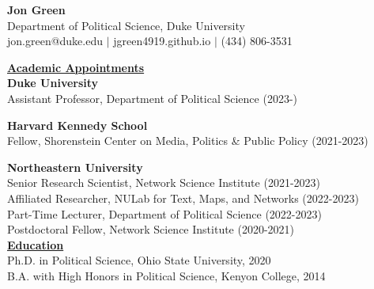 \documentclass{article}
\begin{document}
\begin{center}
\thispagestyle{empty}
\large \textbf{Jon Green} \\
\normalsize Department of Political Science, Duke University\\
\normalsize jon.green@duke.edu $\mid$ jgreen4919.github.io $\mid$ (434) 806-3531
\end{center}

\noindent \textbf{\underline{Academic Appointments}}\\

\noindent \textbf{Duke University}\\
\indent Assistant Professor, Department of Political Science (2023-)

\noindent \textbf{Harvard Kennedy School}\\
\indent Fellow, Shorenstein Center on Media, Politics \& Public Policy (2021-2023)

\noindent \textbf{Northeastern University}\\
\indent Senior Research Scientist, Network Science Institute (2021-2023)\\
\indent Affiliated Researcher, NULab for Text, Maps, and Networks (2022-2023) \\
\indent Part-Time Lecturer, Department of Political Science (2022-2023) \\
\indent Postdoctoral Fellow, Network Science Institute (2020-2021) \\

\noindent \textbf{\underline{Education}}\\

\noindent Ph.D. in Political Science, Ohio State University, 2020 \\
\noindent B.A. with High Honors in Political Science, Kenyon College, 2014 \\


\end{document}
